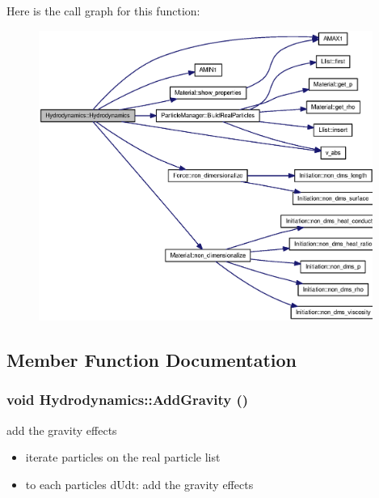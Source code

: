Here is the call graph for this function:\nopagebreak
\begin{figure}[H]
\begin{center}
\leavevmode
\includegraphics[width=310pt]{classHydrodynamics_837d2adb43e7d4ea4fa5a1c89bb59313_cgraph}
\end{center}
\end{figure}


\subsection{Member Function Documentation}
\hypertarget{classHydrodynamics_abdebac769f07f2500c21689fafa2981}{
\subsubsection[{AddGravity}]{\setlength{\rightskip}{0pt plus 5cm}void Hydrodynamics::AddGravity ()}}
\label{classHydrodynamics_abdebac769f07f2500c21689fafa2981}


add the gravity effects 



\begin{itemize}
\item iterate particles on the real particle list\end{itemize}


\begin{itemize}
\item to each particles dUdt: add the gravity effects \end{itemize}


